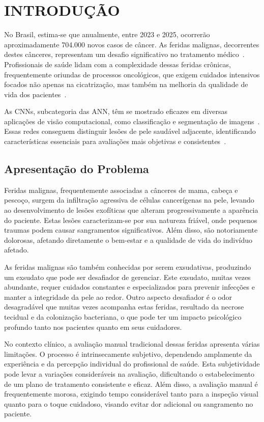\section{INTRODUÇÃO}
No Brasil, estima-se que anualmente, entre 2023 e 2025, ocorrerão aproximadamente 704.000 novos casos de câncer. As feridas malignas, decorrentes destes cânceres, representam um desafio significativo no tratamento médico~\cite{de2023estimativa}. Profissionais de saúde lidam com a complexidade dessas feridas crônicas, frequentemente oriundas de processos oncológicos, que exigem cuidados intensivos focados não apenas na cicatrização, mas também na melhoria da qualidade de vida dos pacientes~\cite{freitas2017intervenccoes, agra2017neoplastic}.

As \ac{CNNs}, subcategoria das \ac{ANN}, têm se mostrado eficazes em diversas aplicações de visão computacional, como classificação e segmentação de imagens~\cite{sun2023convolution}. Essas redes conseguem distinguir lesões de pele saudável adjacente, identificando características essenciais para avaliações mais objetivas e consistentes~\cite{litjens2017, lundervold2019, esteva2019}.

\subsection{Apresentação do Problema}
Feridas malignas, frequentemente associadas a cânceres de mama, cabeça e pescoço, surgem da infiltração agressiva de células cancerígenas na pele, levando ao desenvolvimento de lesões exofíticas que alteram progressivamente a aparência do paciente. Estas lesões caracterizam-se por sua natureza friável, onde pequenos traumas podem causar sangramentos significativos. Além disso, são notoriamente dolorosas, afetando diretamente o bem-estar e a qualidade de vida do indivíduo afetado.

As feridas malignas são também conhecidas por serem exsudativas, produzindo um exsudato que pode ser desafiador de gerenciar. Este exsudato, muitas vezes abundante, requer cuidados constantes e especializados para prevenir infecções e manter a integridade da pele ao redor. Outro aspecto desafiador é o odor desagradável que muitas vezes acompanha estas feridas, resultado da necrose tecidual e da colonização bacteriana, o que pode ter um impacto psicológico profundo tanto nos pacientes quanto em seus cuidadores.

No contexto clínico, a avaliação manual tradicional dessas feridas apresenta várias limitações. O processo é intrinsecamente subjetivo, dependendo amplamente da experiência e da percepção individual do profissional de saúde. Esta subjetividade pode levar a variações consideráveis na avaliação, dificultando o estabelecimento de um plano de tratamento consistente e eficaz. Além disso, a avaliação manual é frequentemente morosa, exigindo tempo considerável tanto para a inspeção visual quanto para o toque cuidadoso, visando evitar dor adicional ou sangramento no paciente.

